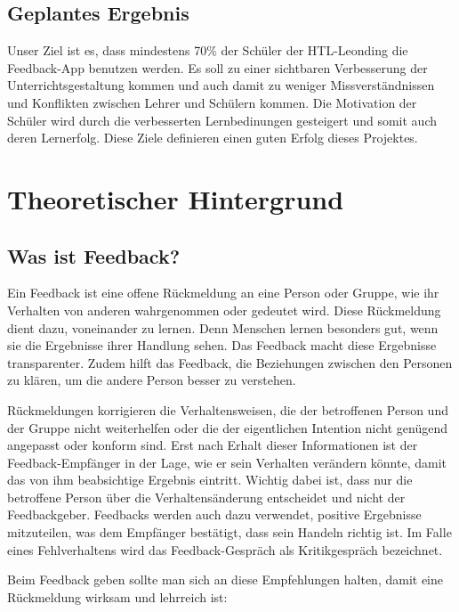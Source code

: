 \subsection{Geplantes Ergebnis}
Unser Ziel ist es, dass mindestens 70\% der Schüler der HTL-Leonding die Feedback-App benutzen werden. 
Es soll zu einer sichtbaren Verbesserung der Unterrichtsgestaltung kommen und auch damit zu weniger Missverständnissen 
und Konflikten zwischen Lehrer und Schülern kommen. Die Motivation der Schüler wird durch die verbesserten Lernbedinungen gesteigert und 
somit auch deren Lernerfolg.
Diese Ziele definieren einen guten Erfolg dieses Projektes.

\section{Theoretischer Hintergrund}
\cite{BWLHTLbook}
\cite{FeedbackBWissen}

\subsection{Was ist Feedback?}

Ein Feedback ist eine offene Rückmeldung an eine Person oder Gruppe, wie ihr Verhalten von anderen 
wahrgenommen oder gedeutet wird. Diese Rückmeldung dient dazu, voneinander zu lernen. Denn Menschen lernen 
besonders gut, wenn sie die Ergebnisse ihrer Handlung sehen. Das Feedback macht diese Ergebnisse transparenter. 
Zudem hilft das Feedback, die Beziehungen zwischen den Personen zu klären, um die andere Person besser zu verstehen.

Rückmeldungen korrigieren die Verhaltensweisen, die der betroffenen Person und der Gruppe nicht weiterhelfen oder 
die der eigentlichen Intention nicht genügend angepasst oder konform sind. Erst nach Erhalt dieser Informationen ist der 
Feedback-Empfänger in der Lage, wie er sein Verhalten verändern könnte, damit das von ihm beabsichtige Ergebnis eintritt. 
Wichtig dabei ist, dass nur die betroffene Person über die Verhaltensänderung entscheidet und nicht der Feedbackgeber. 
Feedbacks werden auch dazu verwendet, positive Ergebnisse mitzuteilen, was dem Empfänger bestätigt, dass sein Handeln richtig ist.
Im Falle eines Fehlverhaltens wird das Feedback-Gespräch als Kritikgespräch bezeichnet.

Beim Feedback geben sollte man sich an diese Empfehlungen halten, damit eine Rückmeldung wirksam und lehrreich ist:

